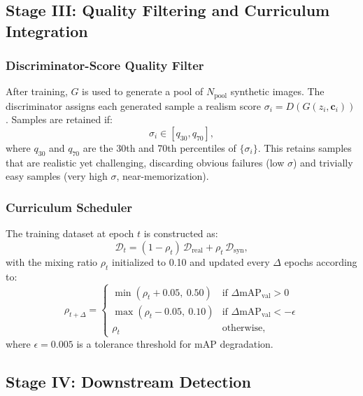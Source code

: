 \documentclass[conference]{IEEEtran}
\begin{document}
\subsection{Stage III: Quality Filtering and Curriculum Integration}

\subsubsection{Discriminator-Score Quality Filter}
After training, $G$ is used to generate a pool of $N_{\text{pool}}$
synthetic images. The discriminator assigns each generated sample a
realism score $\sigma_i = D(G(z_i, \mathbf{c}_i))$. Samples are
retained if:
\begin{equation}
    \sigma_i \in [q_{30}, q_{70}],
    \label{eq:filter}
\end{equation}
where $q_{30}$ and $q_{70}$ are the 30th and 70th percentiles of
$\{\sigma_i\}$. This retains samples that are realistic yet
challenging, discarding obvious failures (low $\sigma$) and trivially
easy samples (very high $\sigma$, near-memorization).

\subsubsection{Curriculum Scheduler}
The training dataset at epoch $t$ is constructed as:
\begin{equation}
    \mathcal{D}_t = (1-\rho_t)\,\mathcal{D}_{\text{real}} +
    \rho_t\,\mathcal{D}_{\text{syn}},
    \label{eq:mix}
\end{equation}
with the mixing ratio $\rho_t$ initialized to 0.10 and updated every
$\Delta$ epochs according to:
\begin{equation}
    \rho_{t+\Delta} =
    \begin{cases}
        \min(\rho_t + 0.05,\ 0.50) & \text{if } \Delta\text{mAP}_{\text{val}} > 0 \\
        \max(\rho_t - 0.05,\ 0.10) & \text{if } \Delta\text{mAP}_{\text{val}} < -\epsilon \\
        \rho_t & \text{otherwise,}
    \end{cases}
    \label{eq:curriculum}
\end{equation}
where $\epsilon = 0.005$ is a tolerance threshold for mAP degradation.

\subsection{Stage IV: Downstream Detection}
\end{document}
